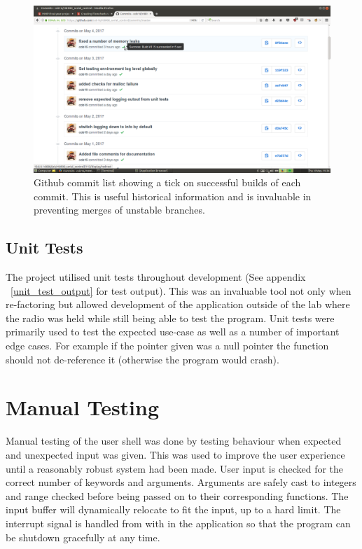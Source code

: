 \begin{figure}
    \centering
    \includegraphics[width=1\textwidth]{img/github_commits.png}
    \caption[Tests on github]{Github commit list showing a tick on successful builds of each commit. This is useful historical information and is invaluable in preventing merges of unstable branches.}
    \label{fig:github_commits}
\end{figure}

\subsection{Unit Tests}
The project utilised unit tests throughout development (See appendix ~\ref{unit_test_output} for test output). This was an invaluable tool not only when re-factoring but allowed development of the application outside of the lab where the radio was held while still being able to test the program. Unit tests were primarily used to test the expected use-case as well as a number of important edge cases. For example if the pointer given was a null pointer the function should not de-reference it (otherwise the program would crash).

\section{Manual Testing}
Manual testing of the user shell was done by testing behaviour when expected and unexpected input was given. This was used to improve the user experience until a reasonably robust system had been made. User input is checked for the correct number of keywords and arguments. Arguments are safely cast to integers and range checked before being passed on to their corresponding functions. The input buffer will dynamically relocate to fit the input, up to a hard limit. The interrupt signal is handled from with in the application so that the program can be shutdown gracefully at any time.

